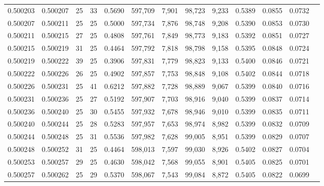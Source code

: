 \begin{tabular}{rrrrrrrrrrrrr}
0.500203 & 0.500207 &    25 &  33 &                                     0.5690 & 597,709 &   7,901 &  98,723 &   9,233 & 0.5389 & 0.0855 & 0.0732 \\
0.500207 & 0.500211 &    25 &  25 &                                     0.5000 & 597,734 &   7,876 &  98,748 &   9,208 & 0.5390 & 0.0853 & 0.0730 \\
0.500211 & 0.500215 &    27 &  25 &                                     0.4808 & 597,761 &   7,849 &  98,773 &   9,183 & 0.5392 & 0.0851 & 0.0727 \\
0.500215 & 0.500219 &    31 &  25 &                                     0.4464 & 597,792 &   7,818 &  98,798 &   9,158 & 0.5395 & 0.0848 & 0.0724 \\
0.500219 & 0.500222 &    39 &  25 &                                     0.3906 & 597,831 &   7,779 &  98,823 &   9,133 & 0.5400 & 0.0846 & 0.0721 \\
0.500222 & 0.500226 &    26 &  25 &                                     0.4902 & 597,857 &   7,753 &  98,848 &   9,108 & 0.5402 & 0.0844 & 0.0718 \\
0.500226 & 0.500231 &    25 &  41 &                                     0.6212 & 597,882 &   7,728 &  98,889 &   9,067 & 0.5399 & 0.0840 & 0.0716 \\
0.500231 & 0.500236 &    25 &  27 &                                     0.5192 & 597,907 &   7,703 &  98,916 &   9,040 & 0.5399 & 0.0837 & 0.0714 \\
0.500236 & 0.500240 &    25 &  30 &                                     0.5455 & 597,932 &   7,678 &  98,946 &   9,010 & 0.5399 & 0.0835 & 0.0711 \\
0.500240 & 0.500244 &    25 &  28 &                                     0.5283 & 597,957 &   7,653 &  98,974 &   8,982 & 0.5399 & 0.0832 & 0.0709 \\
0.500244 & 0.500248 &    25 &  31 &                                     0.5536 & 597,982 &   7,628 &  99,005 &   8,951 & 0.5399 & 0.0829 & 0.0707 \\
0.500248 & 0.500252 &    31 &  25 &                                     0.4464 & 598,013 &   7,597 &  99,030 &   8,926 & 0.5402 & 0.0827 & 0.0704 \\
0.500253 & 0.500257 &    29 &  25 &                                     0.4630 & 598,042 &   7,568 &  99,055 &   8,901 & 0.5405 & 0.0825 & 0.0701 \\
0.500257 & 0.500262 &    25 &  29 &                                     0.5370 & 598,067 &   7,543 &  99,084 &   8,872 & 0.5405 & 0.0822 & 0.0699 \\

\end{tabular}
